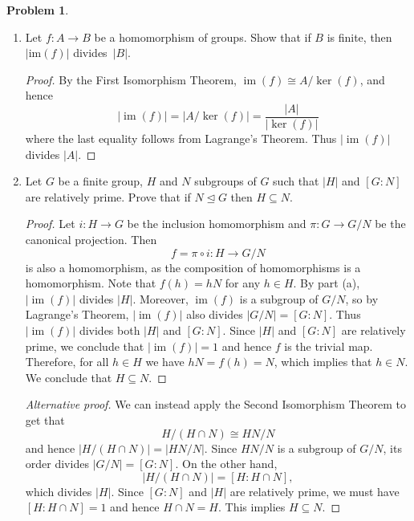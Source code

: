 \documentclass[11pt]{article}
\DeclareMathOperator{\im}{im}
\theoremstyle{definition}
\newtheorem{problem}{Problem}
\begin{document}
\begin{problem} \phantom{ }
\begin{enumerate}[(2.1)]
\item Let $f:A \to B$ be a homomorphism of groups. Show that if $B$ is finite, then $|\mathrm{im}(f)|$ divides~$|B|$.

\begin{proof}
By the First Isomorphism Theorem, $\im(f) \cong A/\ker(f)$, and hence 
$$|\im(f)| = |A/\ker(f)| = \frac{|A|}{|\ker(f)|}$$ 
where the last equality follows from Lagrange's Theorem.
Thus $|\im(f)|$ divides $|A|$.
\end{proof}


\item  Let $G$ be a finite group, $H$ and $N$ subgroups of $G$ such that $|H|$ and $[G : N]$ are relatively prime. Prove that if $N \trianglelefteq G$ then $H \subseteq N$.

\begin{proof}
Let $i\!: H \to G$ be the inclusion homomorphism and $\pi\!: G \to G/N$ be the canonical projection. Then
$$f = \pi \circ i \!: H \to G/N$$ 
is also a homomorphism, as the composition of homomorphisms is a homomorphism. Note that $f(h) = hN$ for any $h \in H$. By part (a), $|\im(f)|$ divides $|H|$. Moreover, $\im(f)$ is a subgroup of $G/N$, so by Lagrange's Theorem, $|\im(f)|$ also divides $|G/N| = [G:N]$. Thus $|\im(f)|$ divides both $|H|$ and $[G:N]$. Since $|H|$ and $[G:N]$ are relatively prime, we conclude that $|\im(f)| = 1$ and hence $f$ is the trivial map. Therefore, for all $h \in H$ we have $hN = f(h) = N$, which implies that $h \in N$. We conclude that $H \subseteq N$.
\end{proof}

\begin{proof}[Alternative proof]
We can instead apply the Second
      Isomorphism Theorem to get that 
      $$H/(H \cap N) \cong HN/N$$ 
      and hence $|H/(H \cap N)| = |HN/N|$. Since $HN/N$ is a subgroup of $G/N$, its order divides $|G/N| = [G: N]$.
      On the other hand,
      $$|H/(H \cap N)| = [H: H \cap N],$$ 
      which divides $|H|$. Since $[G:N]$ and $|H|$ are relatively prime, we must have $[H: H \cap N] = 1$ and hence $H \cap N = H$. This implies $H \subseteq N$.   
    \end{proof}
    
\end{enumerate}
\end{problem}


\
\end{document}
